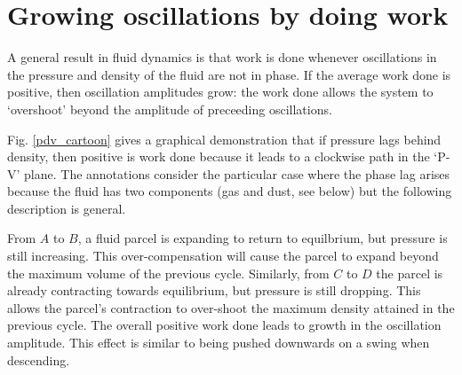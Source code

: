\documentclass[iop, numberedappendix]{emulateapj}
\begin{document}
\section{Growing oscillations by doing work}\label{grow_osc}
A general result in fluid dynamics is that work is done whenever
oscillations in the pressure and density of the fluid are not in
phase. If  the average work done is positive, then oscillation
amplitudes grow: the work done allows the system to `overshoot' beyond 
the amplitude of preceeding oscillations.   


Fig. \ref{pdv_cartoon} gives a graphical demonstration that 
if pressure lags behind density, then positive is work done 
because it leads to a clockwise path in the 
`P-V' plane. The annotations consider the particular case where the
phase lag arises because the fluid has two components (gas and dust,
see below) but the following description is general. 

From $A$ to $B$, a fluid parcel is expanding to return to 
equilbrium, but pressure is still 
increasing. This over-compensation will cause the parcel to expand
beyond the maximum volume of the previous cycle. 
Similarly, from $C$ to $D$ the parcel is already contracting towards
equilibrium, but pressure 
is still dropping. This allows the  
parcel's contraction to over-shoot the maximum density attained in the
previous cycle. 
The overall positive work done leads to growth in the oscillation amplitude. 
This effect is similar to being pushed downwards on a swing when 
descending.
\end{document}
